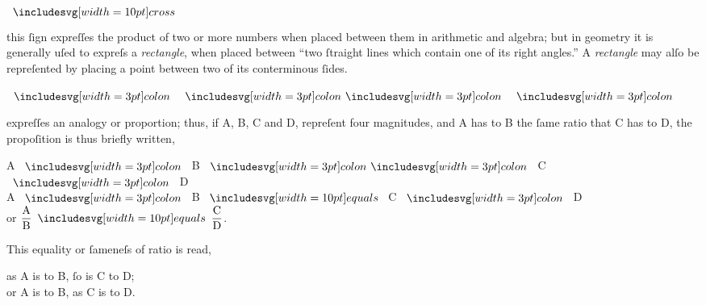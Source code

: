 \begin{minipage}[t]{0.20\textwidth}
    \begin{center}
        $\bcross$
    \end{center}
\end{minipage}%
\begin{minipage}[t]{0.80\textwidth}
    this ſign expreſſes the product of two or more numbers when placed between them in arithmetic and algebra; but in geometry it is generally uſed to expreſs a \textit{rectangle}, when placed between “two ſtraight lines which contain one of its right angles.” A \textit{rectangle} may alſo be repreſented by placing a point between two of its conterminous ſides.
\end{minipage}

\hfill

\hfill

\hfill

\hfill

\begin{minipage}[t]{0.20\textwidth}
    \begin{center}
        $\bcolon\ \bbcolon\ \bcolon$
    \end{center}
\end{minipage}%
\begin{minipage}[t]{0.80\textwidth}
    expreſſes an analogy or proportion; thus, if A, B, C and D, repreſent four magnitudes, and A has to B the ſame ratio that C has to D, the propoſition is thus briefly written,\\
    \begin{center}
        A $\bcolon$ B $\bbcolon$ C $\bcolon$ D\\
        A $\bcolon$ B $\bequals$ C $\bcolon$ D\\
        or $\dfrac{\text{A}}{\text{B}} \bequals \dfrac{\text{C}}{\text{D}}$.
    \end{center}
\end{minipage}

\begin{minipage}[t]{0.20\textwidth}
    \phantom{}
\end{minipage}
\begin{minipage}[t]{0.80\textwidth}
    This equality or ſameneſs of ratio is read,\\
    \begin{center}
        as A is to B, ſo is C to D;\\
        or A is to B, as C is to D.
    \end{center}
\end{minipage}

